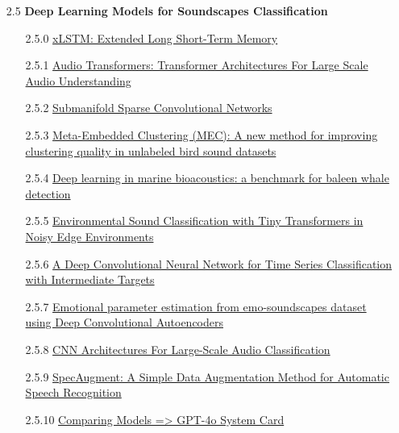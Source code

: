 \begin{enumerate}
\begin{enumerate}
        \item [2.5] \textbf{Deep Learning Models for Soundscapes Classification}
            \begin{enumerate}
                \item [2.5.0] \href{https://doi.org/10.48550/arXiv.2405.04517}{xLSTM: Extended Long Short-Term Memory}
                \item [2.5.1] \href{https://doi.org/10.48550/arXiv.2105.00335}{Audio Transformers: Transformer Architectures For Large Scale Audio Understanding}
                \item [2.5.2] \href{https://arxiv.org/pdf/1706.01307}{Submanifold Sparse Convolutional Networks}
                \item [2.5.3] \href{https://doi.org/10.1016/j.ecoinf.2024.102687}{Meta-Embedded Clustering (MEC): A new method for improving clustering quality in unlabeled bird sound datasets}
                \item [2.5.4] \href{https://doi.org/10.1002/rse2.392}{Deep learning in marine bioacoustics: a benchmark for baleen whale detection}
                \item [2.5.5] \href{https://doi.org/10.1109/WF-IoT51360.2021.9596007}{Environmental Sound Classification with Tiny Transformers in Noisy Edge Environments}
                \item [2.5.6] \href{https://doi.org/10.1007/s42979-023-02159-4}{A Deep Convolutional Neural Network for Time Series Classification with Intermediate Targets}
                \item [2.5.7] \href{https://doi.org/10.1007/s11042-024-20275-y}{Emotional parameter estimation from emo-soundscapes dataset using Deep Convolutional Autoencoders}
                \item [2.5.8] \href{https://doi.org/10.48550/arXiv.1609.09430}{CNN Architectures For Large-Scale Audio Classification}
                \item [2.5.9] \href{https://doi.org/10.48550/arXiv.1904.08779}{SpecAugment: A Simple Data Augmentation Method for Automatic Speech Recognition}
                \item [2.5.10] \href{https://doi.org/10.48550/arXiv.2410.21276}{Comparing Models => GPT-4o System Card}
            \end{enumerate}
            

\end{enumerate}
\end{enumerate}
